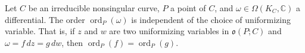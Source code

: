 Let $C$ be an irreducible nonsingular curve, $P$ a point of $C$, and $\omega \in \Omega(K_C, \mathbb{C})$ a differential. The order $\operatorname{ord}_P(\omega)$ is independent of the choice of uniformizing variable. That is, if $z$ and $w$ are two uniformizing variables in $\mathfrak{o}(P; C)$ and $\omega = f\,dz = g\,dw$, then $\operatorname{ord}_P(f) = \operatorname{ord}_P(g)$.
